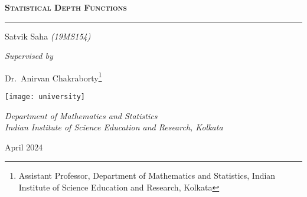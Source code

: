 \begin{titlepage}
    \vspace*{2cm}


    {\noindent\Huge\scshape\bfseries%
        Statistical Depth Functions
    }

    \vspace{0.8cm}
    \hrule
    \vspace{0.4cm}

    {\noindent\Large Satvik Saha \textcolor{black!70!white}{\textit{(19MS154)}}}
    \vspace{0.6cm}

    {\noindent\Large\itshape Supervised by}
    \vspace{0.1cm}

    \renewcommand*{\thefootnote}{\fnsymbol{footnote}}
    {\noindent\Large Dr.~Anirvan Chakraborty\footnote{Assistant Professor, Department of Mathematics and Statistics, Indian Institute of Science Education and Research, Kolkata}}
    \renewcommand*{\thefootnote}{\arabic{footnote}}
    \setcounter{footnote}{0}

    \vfill

    \noindent\texttt{[image: university]}

    \vspace{0.2cm}

    {\noindent\large\itshape
        Department of Mathematics and Statistics \vspace{0.2em}\\
        Indian Institute of Science Education and Research, Kolkata \\
    }
    \vspace{0.8cm}

    {\noindent\large April 2024}

    \vspace*{2cm}
\end{titlepage}
